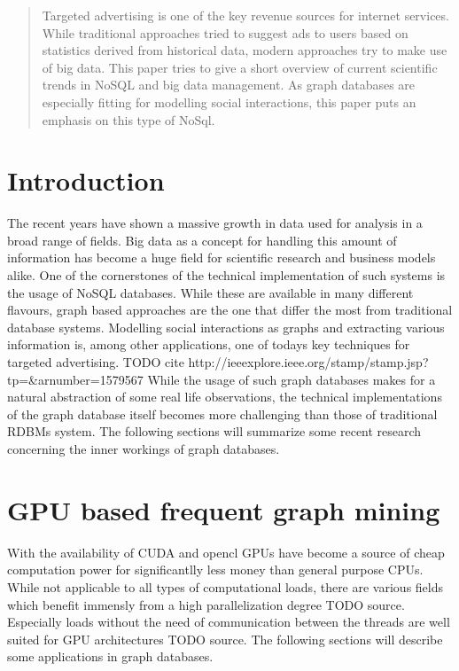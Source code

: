 \documentclass{sig-alternate}
\begin{document}
\maketitle
\begin{abstract}
Targeted advertising is one of the key revenue sources 
for internet services. While traditional approaches tried
to suggest ads to users based on statistics derived from historical data,
modern approaches try to make use of big data.
This paper tries to give a short overview of current scientific trends 
in NoSQL and big data management. As graph databases are especially fitting for 
modelling social interactions, this paper puts an emphasis on this type of NoSql.
\end{abstract}


\section{Introduction}
The recent years have shown a massive growth in data 
used for analysis in a broad range of fields.
Big data as a concept for handling this amount of information
has become a huge field for scientific research and 
business models alike. One of the cornerstones of the technical
implementation of such systems is the usage of NoSQL databases.
While these are available in many different flavours, graph based approaches
are the one that differ the most from traditional database systems.
Modelling social interactions as graphs and extracting various information
is, among other applications, one of todays key techniques for targeted advertising. TODO cite http://ieeexplore.ieee.org/stamp/stamp.jsp?tp=&arnumber=1579567
While the usage of such graph databases makes for a natural abstraction
of some real life observations, the technical implementations
of the graph database itself becomes more challenging than those of
traditional RDBMs system.
The following sections will summarize some recent research concerning 
the inner workings of graph databases.

\section{GPU based frequent graph mining}
With the availability of CUDA and opencl GPUs have become
a source of cheap computation power for significantlly less money 
than general purpose CPUs. While not applicable to all types
of computational loads, there are various fields which benefit 
immensly from a high parallelization degree TODO source.
Especially loads without the need of communication between the 
threads are well suited for GPU architectures TODO source.
The following sections will describe some applications in graph databases.
\end{document}
